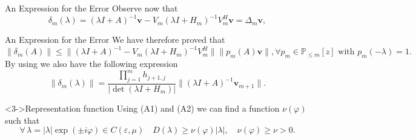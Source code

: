 \documentclass[aspectratio=169,xcolor=dvipsnames]{beamer}
\begin{document}
\begin{frame}{An Expression for the Error}
Observe now that
\[
\delta_m(\lambda) = (\lambda I + A)^{-1}\mathbf{v} - V_m(\lambda I + H_m)^{-1}V_m^H \mathbf{v} = \Delta_m \mathbf{v},
\]
\end{frame}

\begin{frame}{An Expression for the Error}
We have therefore proved that 
\[
\|\delta_m(A)\| \leq \| (\lambda I + A)^{-1} - V_m (\lambda I + H_m)^{-1} V_m^H\| \|p_m(A)\mathbf{v}\|, \forall p_m \in \mathbb{P}_{\leq m}[z] \text{ with } p_m(-\lambda) = 1.
\]
By using \parencite[Lemma~2]{MR2486853} we also have the following expression
\[
\|\delta_m(\lambda)\| = \frac{\prod_{j=1}^{m} h_{j+1,j}}{|\det(\lambda I + H_m)|} \| (\lambda I + A)^{-1} \mathbf{v}_{m+1}\|.
\]
\begin{block}<3->{Representation function}
Using (A1) and (A2) we can find a function $\nu(\varphi)$ such that
\[
\forall\,\lambda = |\lambda| \exp(\pm i \varphi) \in C(\varepsilon,\mu) \quad D(\lambda) \geq \nu(\varphi) |\lambda|, \quad \nu(\varphi) \geq \nu > 0.
\]
\end{block}

\end{frame}
\end{document}
